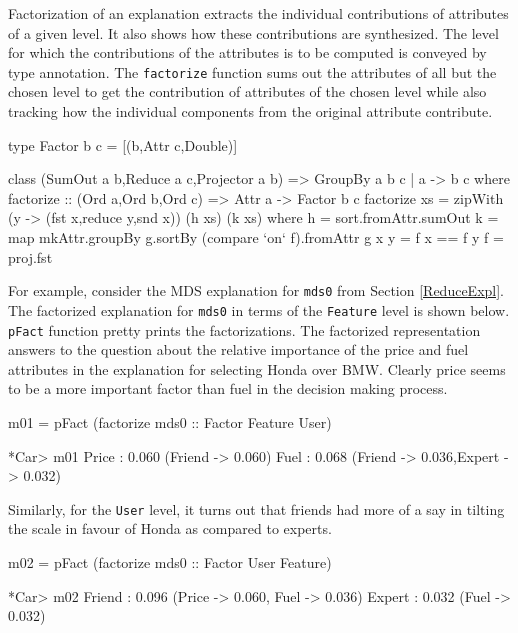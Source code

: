 \documentclass{jfp}
\newcommand{\prog}[1]{\texttt{#1}}
\begin{document}
Factorization of an explanation extracts the individual contributions of attributes of a given level. It also shows how these contributions are synthesized. The level for which the contributions of the attributes is to be computed is conveyed by type annotation. The \prog{factorize} function sums out the attributes of all but the chosen level to get the contribution of attributes of the chosen level while also tracking how the individual components from the original attribute contribute.
\begin{haskellcode}
type Factor b c = [(b,Attr c,Double)]

class (SumOut a b,Reduce a c,Projector a b) => GroupBy a b c | a -> b c where 
  factorize :: (Ord a,Ord b,Ord c) => Attr a -> Factor b c
  factorize xs = zipWith (\x y -> (fst x,reduce y,snd x)) (h xs) (k xs)
      where h = sort.fromAttr.sumOut
            k = map mkAttr.groupBy g.sortBy (compare `on` f).fromAttr 
            g x y = f x == f y
            f = proj.fst 
\end{haskellcode}
For example, consider the MDS explanation for \prog{mds0} from Section \ref{ReduceExpl}. The factorized explanation for \prog{mds0} in terms of the \prog{Feature} level is shown below. \prog{pFact} function pretty prints the factorizations. The factorized representation answers to the question about the relative importance of the price and fuel attributes in the explanation for selecting Honda over BMW. Clearly price seems to be a more important factor than fuel in the decision making process.
\begin{haskellcode}
m01 = pFact (factorize mds0 :: Factor Feature User)

*Car> m01
Price : 0.060 ({Friend -> 0.060})
Fuel : 0.068 ({Friend -> 0.036,Expert -> 0.032})
\end{haskellcode}
Similarly, for the \prog{User} level, it turns out that friends had more of a say in tilting the scale in favour of Honda as compared to experts. 
\begin{haskellcode}
m02 = pFact (factorize mds0 :: Factor User Feature)

*Car> m02
Friend : 0.096 ({Price -> 0.060, Fuel -> 0.036})
Expert : 0.032 ({Fuel -> 0.032})
\end{haskellcode}
\end{document}
